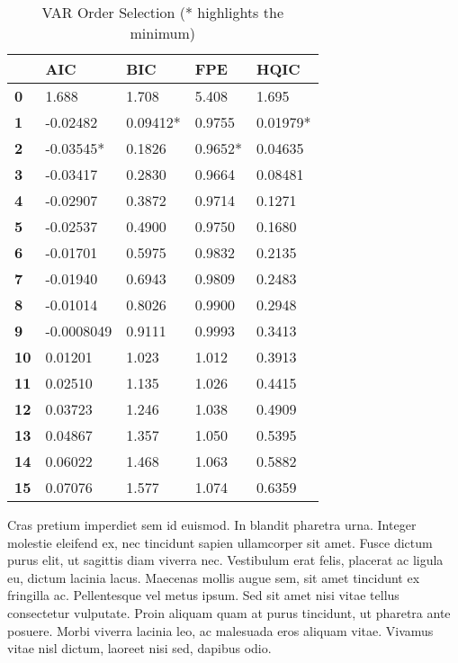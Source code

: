 \documentclass{article}
\begin{document}
\begin{table}
    \centering
    \begin{tabular}{lllll}
      \toprule
        ~ & \textbf{AIC} & \textbf{BIC} & \textbf{FPE} & \textbf{HQIC} \\ \midrule
        \textbf{0}  &       1.688  &       1.708  &       5.408  &        1.695   \\
        \textbf{1}  &    -0.02482  &    0.09412*  &      0.9755  &     0.01979*   \\
        \textbf{2}  &   -0.03545*  &      0.1826  &     0.9652*  &      0.04635   \\
        \textbf{3}  &    -0.03417  &      0.2830  &      0.9664  &      0.08481   \\
        \textbf{4}  &    -0.02907  &      0.3872  &      0.9714  &       0.1271   \\
        \textbf{5}  &    -0.02537  &      0.4900  &      0.9750  &       0.1680   \\
        \textbf{6}  &    -0.01701  &      0.5975  &      0.9832  &       0.2135   \\
        \textbf{7}  &    -0.01940  &      0.6943  &      0.9809  &       0.2483   \\
        \textbf{8}  &    -0.01014  &      0.8026  &      0.9900  &       0.2948   \\
        \textbf{9}  &  -0.0008049  &      0.9111  &      0.9993  &       0.3413   \\
        \textbf{10} &     0.01201  &       1.023  &       1.012  &       0.3913   \\
        \textbf{11} &     0.02510  &       1.135  &       1.026  &       0.4415   \\
        \textbf{12} &     0.03723  &       1.246  &       1.038  &       0.4909   \\
        \textbf{13} &     0.04867  &       1.357  &       1.050  &       0.5395   \\
        \textbf{14} &     0.06022  &       1.468  &       1.063  &       0.5882   \\
        \textbf{15} &     0.07076  &       1.577  &       1.074  &       0.6359   \\ 
        \bottomrule
        \end{tabular}
    \caption{VAR Order Selection (* highlights the minimum)}
    \label{VAROrderSelection}
\end{table}

Cras pretium imperdiet sem id euismod. In blandit pharetra urna. Integer
molestie eleifend ex, nec tincidunt sapien ullamcorper sit amet. Fusce
dictum purus elit, ut sagittis diam viverra nec. Vestibulum erat felis,
placerat ac ligula eu, dictum lacinia lacus. Maecenas mollis augue sem,
sit amet tincidunt ex fringilla ac. Pellentesque vel metus ipsum. Sed
sit amet nisi vitae tellus consectetur vulputate. Proin aliquam quam at
purus tincidunt, ut pharetra ante posuere. Morbi viverra lacinia leo, ac
malesuada eros aliquam vitae. Vivamus vitae nisl dictum, laoreet nisi
sed, dapibus odio.
\end{document}
